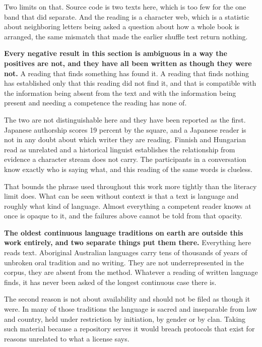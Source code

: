 Two limits on that. Source code is two texts here, which is too few for the one band that did separate. And the reading is a character web, which is a statistic about neighboring letters being asked a question about how a whole book is arranged, the same mismatch that made the earlier shuffle test return nothing.

\textbf{Every negative result in this section is ambiguous in a way the positives are not, and they have all been written as though they were not.} A reading that finds something has found it. A reading that finds nothing has established only that this reading did not find it, and that is compatible with the information being absent from the text and with the information being present and needing a competence the reading has none of.

The two are not distinguishable here and they have been reported as the first. Japanese authorship scores 19 percent by the square, and a Japanese reader is not in any doubt about which writer they are reading. Finnish and Hungarian read as unrelated and a historical linguist establishes the relationship from evidence a character stream does not carry. The participants in a conversation know exactly who is saying what, and this reading of the same words is clueless.

That bounds the phrase used throughout this work more tightly than the literacy limit does. What can be seen without context is that a text is language and roughly what kind of language. Almost everything a competent reader knows at once is opaque to it, and the failures above cannot be told from that opacity.

\textbf{The oldest continuous language traditions on earth are outside this work entirely, and two separate things put them there.} Everything here reads text. Aboriginal Australian languages carry tens of thousands of years of unbroken oral tradition and no writing. They are not underrepresented in the corpus, they are absent from the method. Whatever a reading of written language finds, it has never been asked of the longest continuous case there is.

The second reason is not about availability and should not be filed as though it were. In many of those traditions the language is sacred and inseparable from law and country, held under restriction by initiation, by gender or by clan. Taking such material because a repository serves it would breach protocols that exist for reasons unrelated to what a license says.

